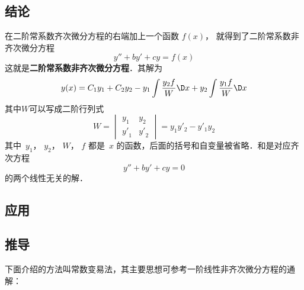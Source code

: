 \subsection{结论}

在二阶常系数齐次微分方程的右端加上一个函数 $f(x)$， 就得到了二阶常系数非齐次微分方程
\begin{equation}\label{Ode2N_eq1}
y'' + by' + cy = f(x)
\end{equation}
这就是\textbf{二阶常系数非齐次微分方程}．其解为
\begin{equation} y(x) = {C_1}{y_1} + {C_2}{y_2} - {y_1}\int {\frac{{y_2}f}{W}\D x + {y_2}\int {\frac{{y_1}f}{W}\D x} } \end{equation}
其中$W$可以写成二阶行列式
\begin{equation}
W = 
\begin{vmatrix}
{{y_1}}&{{y_2}}\\
{{{y'}_1}}&{{{y'}_2}}
\end{vmatrix} = {y_1}{y'_2} - {y'_1}{y_2}
\end{equation}
其中\ $y_1$，  $y_2$，  $W$，  $f$ 都是\ $x$ 的函数，后面的括号和自变量被省略．和是对应齐次方程 
\begin{equation}\label{Ode2N_eq4}
y'' + by' + cy = 0
\end{equation}
的两个线性无关的解．

\subsection{应用} %

\subsection{推导}

下面介绍的方法叫常数变易法，其主要思想可参考一阶线性非齐次微分方程的通解：

